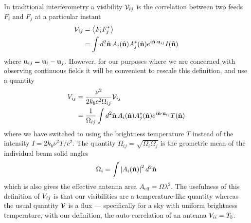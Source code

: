 \documentclass[prd,twocolumn,nofootinbib]{revtex4}
\begin{document}
In traditional interferometry a visibility $\mathcal{V}_{ij}$ is the correlation
between two feeds $F_i$ and $F_j$ at a particular instant
\begin{align}
  \mathcal{V}_{ij} & = \left\langle F_i F_j^* \right\rangle \\
  &= \int d^2\hat{\mathbf{n}} \, A_i(\hat{\mathbf{n}}) A_j^*(\hat{\mathbf{n}}) e^{i \hat{\mathbf{n}} \cdot \mathbf{u}_{ij}}
  I(\hat{\mathbf{n}})
\end{align}
where $\mathbf{u}_{ij} = \mathbf{u}_i - \mathbf{u}_j$. However, for our purposes where we are
concerned with observing continuous fields it will be convenient to rescale this
definition, and use a quantity
\begin{align}
\label{eq:nvis}
V_{ij} & = \frac{\nu^2}{2 k_b c^2 \Omega_{ij}} \mathcal{V}_{ij} \\ 
&= \frac{1}{\Omega_{ij}}\int d^2\hat{\mathbf{n}} \, A_i(\hat{\mathbf{n}}) A_j^*(\hat{\mathbf{n}})
  e^{i \hat{\mathbf{n}} \cdot \mathbf{u}_{ij}} T(\hat{\mathbf{n}})
\end{align}
where we have switched to using the brightness temperature $T$ instead of the
intensity $I = 2 k_b \nu^2 T / c^2$. The quantity $\Omega_{ij} = \sqrt{\Omega_i
  \Omega_j}$ is the geometric mean of the individual beam solid angles
\begin{equation}
\Omega_i = \int \left\lvert A_i(\hat{\mathbf{n}}) \right\rvert^2 d^2\hat{\mathbf{n}}
\end{equation}
which is also gives the effective antenna area $A_\text{eff} = \Omega
\lambda^2$. The usefulness of this definition of $V_{ij}$ is that our
visibilities are a temperature-like quantity whereas the usual quantity $\mathcal{V}$
is a flux --- specifically for a sky with uniform brightness temperature, with
our definition, the auto-correlation of an antenna $V_{ii} = T_b$.
\end{document}
